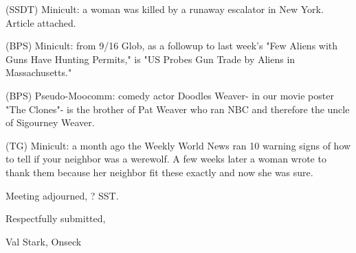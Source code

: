 \documentclass[12pt]{article}
\begin{document}
(SSDT) Minicult: a woman was killed by a runaway escalator in New York. Article attached.

(BPS) Minicult: from 9/16 Glob, as a followup to last week's "Few Aliens with Guns Have Hunting Permits," is "US Probes Gun Trade by Aliens in Massachusetts."

(BPS) Pseudo-Moocomm: comedy actor Doodles Weaver- in our movie poster "The Clones"- is the brother of Pat Weaver who ran NBC and therefore the uncle of Sigourney Weaver.

(TG) Minicult: a month ago the Weekly World News ran 10 warning signs of how to tell if your neighbor was a werewolf. A few weeks later a woman wrote to thank them because her neighbor fit these exactly and now she was sure.

\vspace{12pt}

\noindent
Meeting adjourned, ? SST.

\vspace{18pt}

\centerline{Respectfully submitted,}
\centerline{Val Stark, Onseck}
\end{document}
